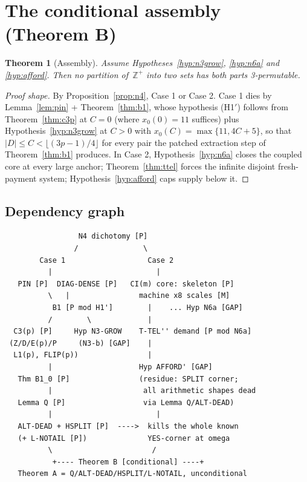 \documentclass[11pt]{article}
\newtheorem{theorem}{Theorem}
\theoremstyle{definition}
\newcommand{\Z}{\mathbb{Z}}
\begin{document}
\section{The conditional assembly (Theorem B)}\label{sec:assembly}

\begin{theorem}[Assembly]\label{thm:assembly}
Assume Hypotheses~\ref{hyp:n3grow}, \ref{hyp:n6a} and \ref{hyp:afford}.
Then no partition of\, $\Z^+$ into two sets has both parts 3-permutable.
\end{theorem}

\begin{proof}[Proof shape]
By Proposition~\ref{prop:n4}, Case 1 or Case 2.  Case 1 dies by
Lemma~\ref{lem:pin} + Theorem~\ref{thm:b1}, whose hypothesis (H1$'$)
follows from Theorem~\ref{thm:c3p} at $C = 0$ (where $x_0(0) = 11$
suffices) plus Hypothesis~\ref{hyp:n3grow} at $C > 0$ with
$x_0(C) = \max\{11, 4C+5\}$, so that $|D| \le C < \lfloor (3p-1)/4
\rfloor$ for every pair the patched extraction step of
Theorem~\ref{thm:b1} produces.  In Case 2, Hypothesis~\ref{hyp:n6a}
closes the coupled core at
every large anchor; Theorem~\ref{thm:ttel} forces the infinite disjoint
fresh-payment system; Hypothesis~\ref{hyp:afford} caps supply below it.
\end{proof}

\subsection*{Dependency graph}

\begin{verbatim}
                 N4 dichotomy [P]
                /               \
        Case 1                   Case 2
          |                        |
   PIN [P]  DIAG-DENSE [P]   CI(m) core: skeleton [P]
          \   |                machine x8 scales [M]
           B1 [P mod H1']        |    ... Hyp N6a [GAP]
          /        \             |
  C3(p) [P]     Hyp N3-GROW    T-TEL'' demand [P mod N6a]
 (Z/D/E(p)/P     (N3-b) [GAP]    |
  L1(p), FLIP(p))                |
          |                    Hyp AFFORD' [GAP]
   Thm B1_0 [P]                (residue: SPLIT corner;
          |                     all arithmetic shapes dead
   Lemma Q [P]                  via Lemma Q/ALT-DEAD)
          |                        |
   ALT-DEAD + HSPLIT [P]  ---->  kills the whole known
   (+ L-NOTAIL [P])              YES-corner at omega
          \                       /
           +---- Theorem B [conditional] ----+
   Theorem A = Q/ALT-DEAD/HSPLIT/L-NOTAIL, unconditional
\end{verbatim}
\end{document}
